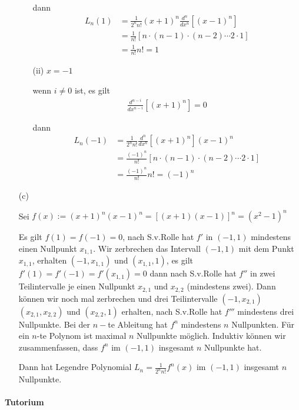 \begin{enumerate}
\begin{enumerate}
dann
\begin{align*}
L_n(1)
&=\frac{1}{2^n n!}(x+1)^n\frac{d^n}{dx^n}[(x-1)^n] \\
&=\frac{1}{n!}[n\cdot (n-1)\cdot (n-2)\cdots 2\cdot 1] \\
&=\frac{1}{n!}n!=1
\end{align*}

\item[(ii)]$x=-1$

wenn $i\neq 0$ ist, es gilt
\begin{align*}
\frac{d^{n-i}}{dx^{n-i}}[(x+1)^n]=0
\end{align*}

dann
\begin{align*}
L_n(-1)
&=\frac{1}{2^n n!}\frac{d^n}{dx^n}[(x+1)^n](x-1)^n \\
&=\frac{(-1)^n}{n!}[n\cdot (n-1)\cdot (n-2)\cdots 2\cdot 1] \\
&=\frac{(-1)^n}{n!}n!=(-1)^n
\end{align*}

\end{enumerate}

\item[(c)]

Sei $f(x):=(x+1)^n(x-1)^n=[(x+1)(x-1)]^n=(x^2-1)^n$

Es gilt $f(1)=f(-1)=0$, nach S.v.Rolle hat $f'$ in $(-1,1)$ mindestens einen Nullpunkt $x_{1,1}$. Wir zerbrechen das Intervall $(-1,1)$ mit dem Punkt $x_{1,1}$, erhalten $(-1,x_{1,1})$ und $(x_{1,1},1)$, es gilt $f'(1)=f'(-1)=f'(x_{1,1})=0$ dann nach S.v.Rolle hat $f''$ in zwei Teilintervalle je einen Nullpunkt $x_{2,1}$ und $x_{2,2}$ (mindestens zwei). Dann können wir noch mal zerbrechen und drei Teilintervalle $(-1,x_{2,1})$ $(x_{2,1},x_{2,2})$ und $(x_{2,2},1)$ erhalten, nach S.v.Rolle hat $f'''$ mindestens drei Nullpunkte. Bei der $n-$te Ableitung hat $f^n$ mindestens $n$ Nullpunkten. Für ein $n$-te Polynom ist maximal $n$ Nullpunkte möglich. Induktiv können wir zusammenfassen, dass $f^n$ im $(-1,1)$ insgesamt $n$ Nullpunkte hat.

Dann hat Legendre Polynomial $L_n=\frac{1}{2^n n!}f^n(x)$ im $(-1,1)$ insgesamt $n$ Nullpunkte.

\end{enumerate}

\newpage

\paragraph{Tutorium}

